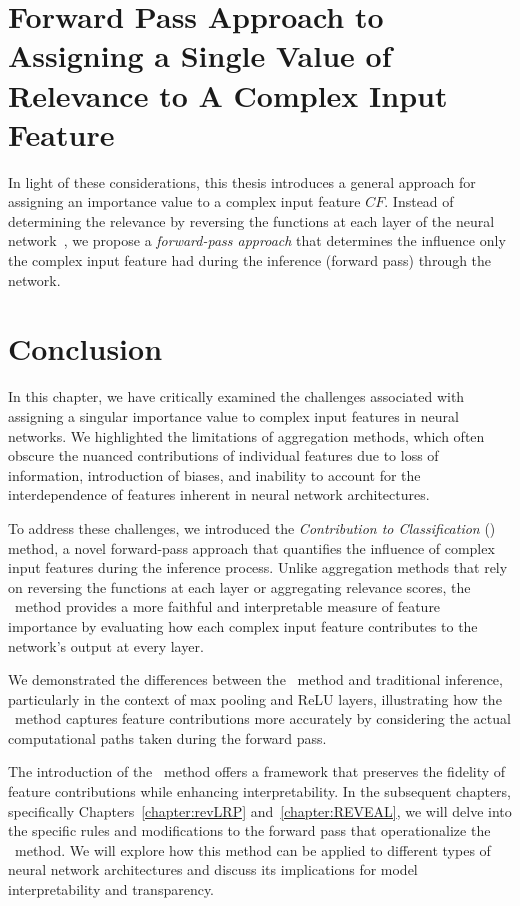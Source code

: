 \section{Forward Pass Approach to Assigning a Single Value of Relevance to  A Complex Input Feature}

In light of these considerations, this thesis introduces a general approach for assigning an importance value to a complex input feature $CF$. Instead of determining the relevance by reversing the functions at each layer of the neural network~\cite{ZeilerKTF10, SpringenbergDBR14, SimonyanVZ13, bach2015pixel, LapuschkinBMMS16, ShrikumarGK17, SundararajanTY17}, we propose a \emph{forward-pass approach} that determines the influence only the complex input feature had during the inference (forward pass) through the network.

\section{Conclusion}

In this chapter, we have critically examined the challenges associated with assigning a singular importance value to complex input features in neural networks. We highlighted the limitations of aggregation methods, which often obscure the nuanced contributions of individual features due to loss of information, introduction of biases, and inability to account for the interdependence of features inherent in neural network architectures.

To address these challenges, we introduced the \emph{Contribution to Classification} (\CTC) method, a novel forward-pass approach that quantifies the influence of complex input features during the inference process. Unlike aggregation methods that rely on reversing the functions at each layer or aggregating relevance scores, the \CTC\ method provides a more faithful and interpretable measure of feature importance by evaluating how each complex input feature contributes to the network's output at every layer.

We demonstrated the differences between the \CTC\ method and traditional inference, particularly in the context of max pooling and ReLU layers, illustrating how the \CTC\ method captures feature contributions more accurately by considering the actual computational paths taken during the forward pass.

The introduction of the \CTC\ method offers a framework that preserves the fidelity of feature contributions while enhancing interpretability. In the subsequent chapters, specifically Chapters~\ref{chapter:revLRP} and~\ref{chapter:REVEAL}, we will delve into the specific rules and modifications to the forward pass that operationalize the \CTC\ method. We will explore how this method can be applied to different types of neural network architectures and discuss its implications for model interpretability and transparency.
